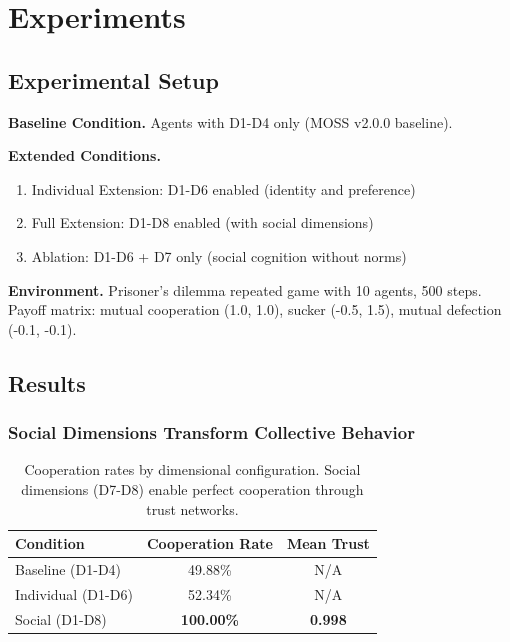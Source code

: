 \documentclass{article}
\begin{document}
\section{Experiments}

\subsection{Experimental Setup}

\textbf{Baseline Condition.} Agents with D1-D4 only (MOSS v2.0.0 baseline).

\textbf{Extended Conditions.}
\begin{enumerate}
    \item Individual Extension: D1-D6 enabled (identity and preference)
    \item Full Extension: D1-D8 enabled (with social dimensions)
    \item Ablation: D1-D6 + D7 only (social cognition without norms)
\end{enumerate}

\textbf{Environment.} Prisoner's dilemma repeated game with 10 agents, 500 steps. Payoff matrix: mutual cooperation (1.0, 1.0), sucker (-0.5, 1.5), mutual defection (-0.1, -0.1).

\subsection{Results}

\subsubsection{Social Dimensions Transform Collective Behavior}

\begin{table}[h]
\centering
\small
\begin{tabular}{lcc}
\toprule
\textbf{Condition} & \textbf{Cooperation Rate} & \textbf{Mean Trust} \\
\midrule
Baseline (D1-D4) & 49.88\% & N/A \\
Individual (D1-D6) & 52.34\% & N/A \\
Social (D1-D8) & \textbf{100.00\%} & \textbf{0.998} \\
\bottomrule
\end{tabular}
\caption{Cooperation rates by dimensional configuration. Social dimensions (D7-D8) enable perfect cooperation through trust networks.}
\end{table}
\end{document}
